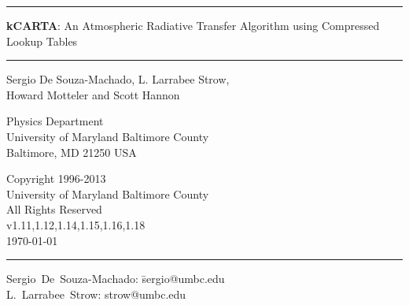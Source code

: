 \documentclass[12pt]{article}
\newcommand{\HRule}{\rule{\linewidth}{1mm}}
\newcommand{\HRulethin}{\rule{\linewidth}{0.5mm}}
\begin{document}
\thispagestyle{empty}
\vspace{2.0in}

\noindent\HRule
\begin{center}
\Huge \textbf{\textsf{kCARTA}}: An Atmospheric Radiative Transfer Algorithm 
using Compressed Lookup Tables
\end{center}
\noindent\HRule

\vspace{0.75in}
\begin{center}
\begin{Large}
Sergio De Souza-Machado, L. Larrabee Strow,\\ Howard Motteler and Scott
Hannon
\end{Large}
\end{center}

\vspace{0.5in}
\begin{center}
Physics Department\\
University of Maryland Baltimore County\\Baltimore, MD 21250 USA\\
\end{center}

\vspace{0.5in}
\begin{center}
Copyright 1996-2013 \\
University of Maryland Baltimore County \\
All Rights Reserved\\
v1.11,1.12,1.14,1.15,1.16,1.18  \\
\today\\
\end{center}

\vfill

\noindent\HRulethin
\begin{flushleft}
\begin{tabbing}
Sergio~De~Souza-Machado: \=    sergio@umbc.edu \\
L.~Larrabee~Strow:   \>        strow@umbc.edu\\
\end{tabbing}
\end{flushleft}


\newpage
\tableofcontents
\listoftables
\listoffigures
\newpage
\end{document}
